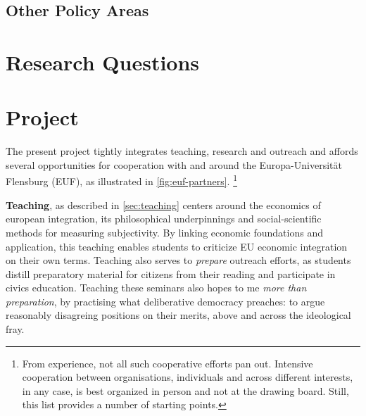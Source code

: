 \documentclass[11pt,a4paper,oneside,english]{article}
\begin{document}
\subsection[Other Policy Areas]{Other Policy Areas} \label{sec:other-policy-areas}

\section[Research Questions]{Research Questions} \label{sec:research-questions}




\section[Project]{Project} \label{sec:project}

The present project tightly integrates teaching, research and outreach and affords several opportunities for cooperation with and around the Europa-Universität Flensburg (EUF), as illustrated in \autoref{fig:euf-partners}.
\footnote{
	From experience, not all such cooperative efforts pan out.
	Intensive cooperation between organisations, individuals and across different interests, in any case, is best organized in person and not at the drawing board.
	Still, this list provides a number of starting points.
}

\textbf{Teaching}, as described in \autoref{sec:teaching} centers around the economics of european integration, its philosophical underpinnings and social-scientific methods for measuring subjectivity.
By linking economic foundations and application, this teaching enables students to criticize EU economic integration on their own terms.
Teaching also serves to \emph{prepare}
 outreach efforts, as students distill preparatory material for citizens from their reading and participate in civics education.
Teaching these seminars also hopes to me \emph{more than preparation}, by practising what deliberative democracy preaches: to argue reasonably disagreing positions on their merits, above and across the ideological fray.
\end{document}
